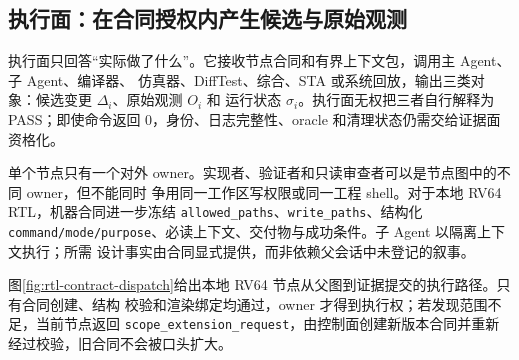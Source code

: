 \documentclass[UTF8,a4paper,zihao=-4,oneside]{ctexart}
\begin{document}
\subsection{执行面：在合同授权内产生候选与原始观测}

执行面只回答“实际做了什么”。它接收节点合同和有界上下文包，调用主 Agent、子 Agent、编译器、
仿真器、DiffTest、综合、STA 或系统回放，输出三类对象：候选变更 $\Delta_i$、原始观测 $O_i$ 和
运行状态 $\sigma_i$。执行面无权把三者自行解释为 PASS；即使命令返回 0，身份、日志完整性、oracle
和清理状态仍需交给证据面资格化。

单个节点只有一个对外 owner。实现者、验证者和只读审查者可以是节点图中的不同 owner，但不能同时
争用同一工作区写权限或同一工程 shell。对于本地 RV64 RTL，机器合同进一步冻结
\texttt{allowed\_paths}、\texttt{write\_paths}、结构化
\texttt{command/mode/purpose}、必读上下文、交付物与成功条件。子 Agent 以隔离上下文执行；所需
设计事实由合同显式提供，而非依赖父会话中未登记的叙事。

图\ref{fig:rtl-contract-dispatch}给出本地 RV64 节点从父图到证据提交的执行路径。只有合同创建、结构
校验和渲染绑定均通过，owner 才得到执行权；若发现范围不足，当前节点返回
\texttt{scope\_extension\_request}，由控制面创建新版本合同并重新经过校验，旧合同不会被口头扩大。
\end{document}

